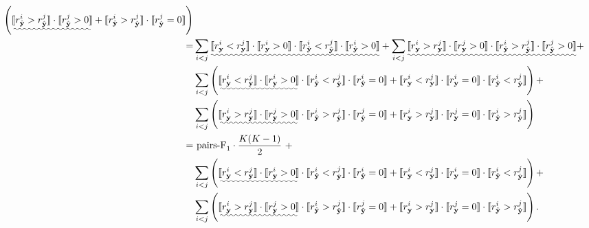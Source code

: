 \begin{align*}
     \left( \uwave{\llb r_{\hat{\mathbf{y}}}^i > r_{\hat{\mathbf{y}}}^j \rrb \cdot \llb r_{\hat{\mathbf{y}}}^j > 0 \rrb} + 
            \llb r_{\hat{\mathbf{y}}}^i > r_{\hat{\mathbf{y}}}^j \rrb \cdot \llb r_{\hat{\mathbf{y}}}^j = 0 \rrb \right) \\
  =& \sum_{i < j} \uwave{\llb r_{\mathbf{y}}^i < r_{\mathbf{y}}^j \rrb \cdot \llb r_{\mathbf{y}}^i > 0 \rrb \cdot
                         \llb r_{\hat{\mathbf{y}}}^i < r_{\hat{\mathbf{y}}}^j \rrb \cdot \llb r_{\hat{\mathbf{y}}}^i > 0 \rrb} +
     \sum_{i < j} \uwave{\llb r_{\mathbf{y}}^i > r_{\mathbf{y}}^j \rrb \cdot \llb r_{\mathbf{y}}^j > 0 \rrb \cdot
                         \llb r_{\hat{\mathbf{y}}}^i > r_{\hat{\mathbf{y}}}^j \rrb \cdot \llb r_{\hat{\mathbf{y}}}^j > 0 \rrb} + \\
   & \sum_{i < j} \left( \uwave{\llb r_{\mathbf{y}}^i < r_{\mathbf{y}}^j \rrb \cdot \llb r_{\mathbf{y}}^i > 0 \rrb} \cdot
                         \llb r_{\hat{\mathbf{y}}}^i < r_{\hat{\mathbf{y}}}^j \rrb \cdot \llb r_{\hat{\mathbf{y}}}^i = 0 \rrb + 
                         \llb r_{\mathbf{y}}^i < r_{\mathbf{y}}^j \rrb \cdot \llb r_{\mathbf{y}}^i = 0 \rrb \cdot 
                         \llb r_{\hat{\mathbf{y}}}^i < r_{\hat{\mathbf{y}}}^j \rrb \right) + \\ 
   & \sum_{i < j} \left( \uwave{\llb r_{\mathbf{y}}^i > r_{\mathbf{y}}^j \rrb \cdot \llb r_{\mathbf{y}}^j > 0 \rrb} \cdot
                         \llb r_{\hat{\mathbf{y}}}^i > r_{\hat{\mathbf{y}}}^j \rrb \cdot \llb r_{\hat{\mathbf{y}}}^j = 0 \rrb +
                         \llb r_{\mathbf{y}}^i > r_{\mathbf{y}}^j \rrb \cdot \llb r_{\mathbf{y}}^j = 0 \rrb \cdot
                         \llb r_{\hat{\mathbf{y}}}^i > r_{\hat{\mathbf{y}}}^j \rrb \right) \\
  =& ~\text{pairs-F}_1 \cdot \frac{K(K-1)}{2}~ + \\
   & \sum_{i < j} \left( \uwave{\llb r_{\mathbf{y}}^i < r_{\mathbf{y}}^j \rrb \cdot \llb r_{\mathbf{y}}^i > 0 \rrb} \cdot
                         \llb r_{\hat{\mathbf{y}}}^i < r_{\hat{\mathbf{y}}}^j \rrb \cdot \llb r_{\hat{\mathbf{y}}}^i = 0 \rrb + 
                         \llb r_{\mathbf{y}}^i < r_{\mathbf{y}}^j \rrb \cdot \llb r_{\mathbf{y}}^i = 0 \rrb \cdot 
                         \llb r_{\hat{\mathbf{y}}}^i < r_{\hat{\mathbf{y}}}^j \rrb \right) + \\ 
   & \sum_{i < j} \left( \uwave{\llb r_{\mathbf{y}}^i > r_{\mathbf{y}}^j \rrb \cdot \llb r_{\mathbf{y}}^j > 0 \rrb} \cdot
                         \llb r_{\hat{\mathbf{y}}}^i > r_{\hat{\mathbf{y}}}^j \rrb \cdot \llb r_{\hat{\mathbf{y}}}^j = 0 \rrb +
                         \llb r_{\mathbf{y}}^i > r_{\mathbf{y}}^j \rrb \cdot \llb r_{\mathbf{y}}^j = 0 \rrb \cdot
                         \llb r_{\hat{\mathbf{y}}}^i > r_{\hat{\mathbf{y}}}^j \rrb \right).
\end{align*}
